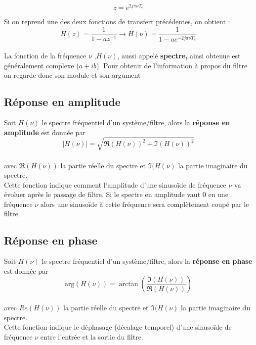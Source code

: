 \documentclass[11pt,a4paper]{article}
\begin{document}
\[ z =  e^{2 j \pi \nu T_e} \]

Si on reprend une des deux fonctions de transfert précédentes, on obtient : \\

\[\boxed{ H(z) =  \frac{1}{1-az^{-1}}  \rightarrow H(\nu) = \frac{1}{1-ae^{-2 j \pi \nu T_e}}  }\] \\

La fonction de la fréquence $\nu$ ,$H(\nu)$, aussi appelé \textbf{spectre,} ainsi obtenue est généralement complexe ($a +ib$). Pour obtenir de l'information à propos du filtre on regarde donc son module et son argument\\

\newpage
\subsection{Réponse en amplitude}
Soit $H(\nu)$ le spectre fréquentiel d'un système/filtre, alors la \textbf{réponse en amplitude} est donnée par\\

\[ \boxed{|H(\nu)| = \sqrt{\Re(H(\nu))^2 + \Im(H(\nu)) ^2}  }\]\\

avec $\Re(H(\nu))$ la partie réelle du spectre et 
$\Im(H(\nu)$ la partie imaginaire du spectre.\\

Cette fonction indique comment l'amplitude d'une sinusoïde de fréquence $\nu$ va évoluer après le passage de filtre. Si le spectre en amplitude vaut 0 en une fréquence $\nu$ alors une sinusoïde à cette fréquence sera complètement coupé par le filtre. 

\subsection{Réponse en phase}
Soit $H(\nu)$ le spectre fréquentiel d'un système/filtre, alors la \textbf{réponse en phase} est donnée par\\

\[ \boxed{\text{arg}(H(\nu)) = \arctan(\frac{  \Im(H(\nu))}{\Re(H(\nu))})  }\]\\

avec $Re(H(\nu))$ la partie réelle du spectre et 
$\Im(H(\nu)$ la partie imaginaire du spectre.\\

Cette fonction indique le déphasage (décalage temporel) d'une sinusoïde de fréquence $\nu$ entre l'entrée et la sortie du filtre.\\
\end{document}
